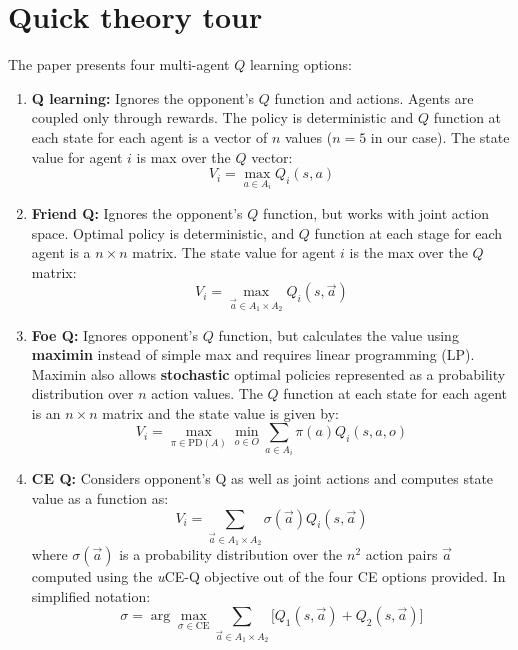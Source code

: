 \documentclass[conference]{IEEEtran}
\begin{document}
\section{Quick theory tour}
The paper presents four multi-agent $Q$ learning options:
\begin{enumerate}
\item {\bf Q learning:} Ignores the opponent's $Q$ function and actions. Agents are coupled only through rewards. The policy is deterministic and $Q$ function at each state for each agent is a vector of $n$ values ($n=5$ in our case). The state value for agent $i$ is max over the $Q$ vector: 
\begin{equation}
V_i =\max_{a\in A_i} Q_i(s,a)
\end{equation} 
%
\item {\bf Friend Q: } Ignores the opponent's $Q$ function, but works with joint action space. Optimal policy is deterministic, and $Q$ function at each stage for each agent is a $n\times n$ matrix. The state value for agent $i$ is the max over the $Q$ matrix:
\begin{equation}
V_i = \max_{\vec{a}\in A_1\times A_2} Q_i(s, \vec{a})
\end{equation}
%
\item {\bf Foe Q: } Ignores opponent's $Q$ function, but calculates the value using {\bf maximin} instead of simple max and requires linear programming (LP). Maximin also allows {\bf stochastic} optimal policies represented as a probability distribution over $n$ action values. The $Q$ function at each state for each agent is an $n\times n$ matrix and the state value is given by: 
%
\begin{equation}
V_i = \max_{\pi\in\text{PD}(A)}\min_{o\in O}\sum_{a\in A_i}\pi(a) Q_i(s, a, o)
\end{equation}
%
\item {\bf CE Q: } Considers opponent's Q as well as joint actions and computes state value as a function as:
%
\begin{equation}
V_i = \sum_{\vec{a}\in A_1\times A_2} \sigma(\vec{a})Q_i(s, \vec{a})
\end{equation}
where $\sigma(\vec{a})$ is a probability distribution over the $n^2$ action pairs $\vec{a}$ computed using the {\em u}CE-Q objective out of the four CE options provided. In simplified notation:
\begin{equation}
\sigma = \arg \max_{\sigma\in\text{CE}} \sum_{\vec{a}\in A_1 \times A_2} \big[Q_1(s, \vec{a}) + Q_2(s, \vec{a})\big]
\end{equation}
\end{enumerate}
\end{document}

